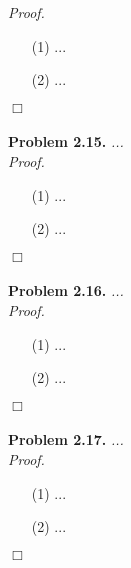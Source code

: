 \documentclass{article}
\begin{document}
\emph{Proof.}
\begin{enumerate}
\item[(1)]
  ...

\item[(2)]
  ...
\end{enumerate}
$\Box$ \\\\






\textbf{Problem 2.15.}
\emph{...} \\



\emph{Proof.}
\begin{enumerate}
\item[(1)]
  ...

\item[(2)]
  ...
\end{enumerate}
$\Box$ \\\\






\textbf{Problem 2.16.}
\emph{...} \\



\emph{Proof.}
\begin{enumerate}
\item[(1)]
  ...

\item[(2)]
  ...
\end{enumerate}
$\Box$ \\\\






\textbf{Problem 2.17.}
\emph{...} \\



\emph{Proof.}
\begin{enumerate}
\item[(1)]
  ...

\item[(2)]
  ...
\end{enumerate}
$\Box$ \\\\
\end{document}

